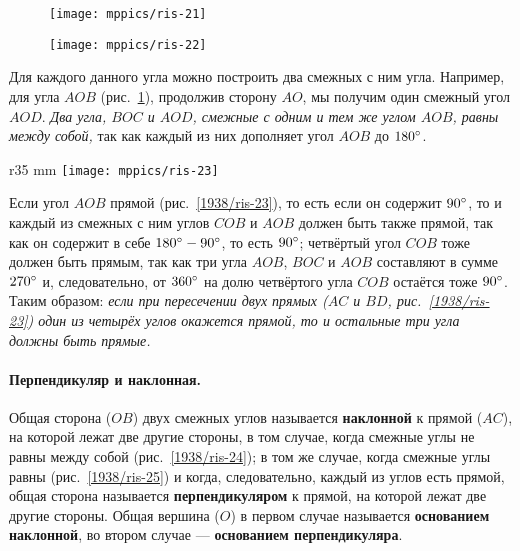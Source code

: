 \begin{figure}[h!]
\begin{minipage}{.48\textwidth}
\centering
\texttt{[image: mppics/ris-21]}
\end{minipage}\hfill
\begin{minipage}{.48\textwidth}
\centering
\texttt{[image: mppics/ris-22]}
\end{minipage}

\medskip

\begin{minipage}{.48\textwidth}
\centering
\caption{}\label{1938/ris-21}
\end{minipage}\hfill
\begin{minipage}{.48\textwidth}
\centering
\caption{}\label{1938/ris-22}
\end{minipage}
\vskip-4mm
\end{figure}

Для каждого данного угла можно построить два смежных с ним угла.
Например, для угла $AOB$ (рис.~\ref{1938/ris-22}), продолжив сторону $AO$, мы получим один смежный угол $AOD$.
\emph{Два угла, $BOC$ и $AOD$, смежные с одним и тем же углом $AOB$, равны между собой,} так как каждый из них дополняет угол $AOB$ до $180\degree$.

\begin{wrapfigure}{r}{35 mm}
\centering
\texttt{[image: mppics/ris-23]}
\caption{}\label{1938/ris-23}
\end{wrapfigure}

Если угол $AOB$ прямой (рис.~\ref{1938/ris-23}), то есть если он содержит $90\degree$, то и каждый из смежных с ним углов $COB$ и $AOB$ должен быть также прямой, так как он содержит в себе $180\degree-90\degree$, то есть $90\degree$;
четвёртый угол $COB$ тоже должен быть прямым, так как три угла $AOB$, $BOC$ и $AOB$ составляют в сумме $270\degree$ и, следовательно, от $360\degree$ на долю четвёртого угла $COB$ остаётся тоже $90\degree$.
Таким образом:
\emph{если при пересечении двух прямых \emph{($AC$ и $BD$, рис.~\ref{1938/ris-23})} один из четырёх углов окажется прямой, то и остальные три угла должны быть прямые.}

\paragraph{Перпендикуляр и наклонная.}\label{1938/23}
Общая сторона ($OB$) двух смежных углов называется \textbf{наклонной} к прямой ($AC$), на которой лежат две другие стороны, в том случае, когда смежные углы не равны между собой (рис.~\ref{1938/ris-24});
в том же случае, когда смежные углы равны (рис.~\ref{1938/ris-25}) и когда, следовательно, каждый из углов есть прямой, общая сторона называется \textbf{перпендикуляром} к прямой, на которой лежат две другие стороны.
Общая вершина ($O$) в первом случае называется \textbf{основанием наклонной}, во втором случае — \textbf{основанием перпендикуляра}.

